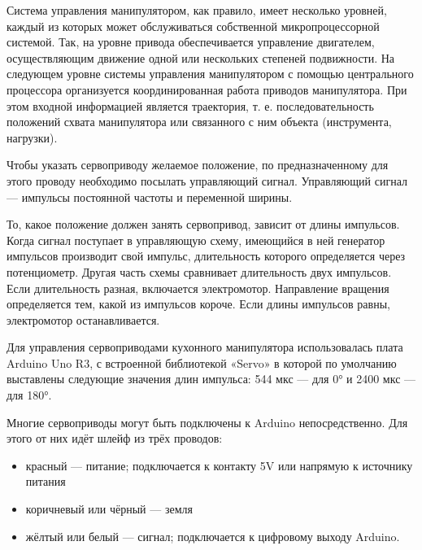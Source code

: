 Система управления манипулятором, как правило, имеет несколько уровней, каждый из которых может обслуживаться собственной микропроцессорной системой. Так, на уровне привода обеспечивается управление двигателем, осуществляющим движение одной или нескольких степеней подвижности. На следующем уровне системы управления манипулятором с помощью центрального процессора организуется координированная работа приводов манипулятора. При этом входной информацией является траектория, т. е. последовательность положений схвата манипулятора или связанного с ним объекта (инструмента, нагрузки).

Чтобы указать сервоприводу желаемое положение, по предназначенному для этого проводу необходимо посылать управляющий сигнал. Управляющий сигнал — импульсы постоянной частоты и переменной ширины.

То, какое положение должен занять сервопривод, зависит от длины импульсов. Когда сигнал поступает в управляющую схему, имеющийся в ней генератор импульсов производит свой импульс, длительность которого определяется через потенциометр. Другая часть схемы сравнивает длительность двух импульсов. Если длительность разная, включается электромотор. Направление вращения определяется тем, какой из импульсов короче. Если длины импульсов равны, электромотор останавливается. 

Для управления сервоприводами кухонного манипулятора использовалась плата Arduino Uno R3, с встроенной библиотекой «Servo» в которой по умолчанию выставлены следующие значения длин импульса: 544 мкс — для 0° и 2400 мкс — для 180°. 

Многие сервоприводы могут быть подключены к Arduino непосредственно. Для этого от них идёт шлейф из трёх проводов:
\begin{itemize}
  \item красный — питание; подключается к контакту 5V или напрямую к источнику питания 
  \item коричневый или чёрный — земля
  \item жёлтый или белый — сигнал; подключается к цифровому выходу Arduino.
\end{itemize}


